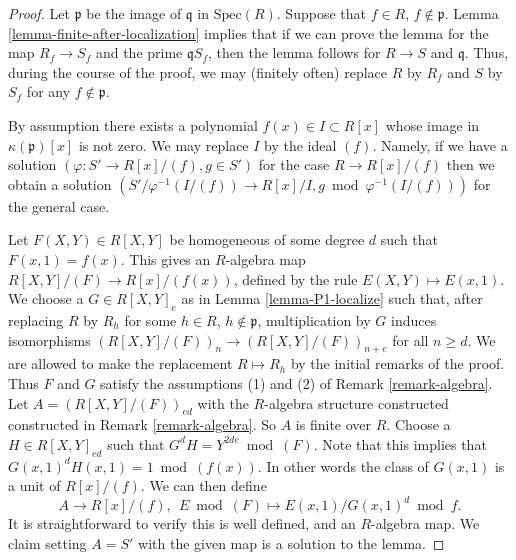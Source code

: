 \begin{proof}
Let $\mathfrak p$ be the image of $\mathfrak q$ in $\text{Spec}(R)$.
Suppose that $f \in R$, $f \not \in \mathfrak p$.
Lemma \ref{lemma-finite-after-localization} implies that if
we can prove the lemma for the map
$R_f \to S_f$ and the prime $\mathfrak qS_f$, then
the lemma follows for $R \to S$ and $\mathfrak q$.
Thus, during the course of the proof, we may (finitely often)
replace $R$ by $R_f$ and $S$ by $S_f$ for any
$f \not \in \mathfrak p$.

\medskip\noindent
By assumption there exists a polynomial $f(x) \in I \subset R[x]$
whose image in $\kappa(\mathfrak p)[x]$ is not zero. We may
replace $I$ by the ideal $(f)$. Namely, if we have a solution
$(\varphi : S' \to R[x]/(f), g \in S')$ for the case $R \to R[x]/(f)$
then we obtain a solution
$(S'/\varphi^{-1}(I/(f)) \to R[x]/I, g \bmod \varphi^{-1}(I/(f)))$
for the general case.

\medskip\noindent
Let $F(X,Y) \in R[X,Y]$ be homogeneous of some degree $d$ such that
$F(x, 1) = f(x)$. This gives an $R$-algebra map $R[X, Y]/(F) \to R[x]/(f(x))$,
defined by the rule $E(X, Y) \mapsto E(x, 1)$.
We choose a $G \in R[X,Y]_e$ as in Lemma \ref{lemma-P1-localize}
such that, after replacing $R$ by $R_h$ for some $h \in R$,
$h \not \in \mathfrak p$, multiplication by $G$ induces isomorphisms
$(R[X, Y]/(F))_n \to (R[X, Y]/(F))_{n + e}$ for
all $n \geq d$. We are allowed to make the replacement
$R \mapsto R_h$ by the initial remarks of the proof.
Thus $F$ and $G$ satisfy the assumptions (1) and (2) of Remark
\ref{remark-algebra}. Let $A = (R[X, Y]/(F))_{ed}$
with the $R$-algebra structure constructed
constructed in Remark \ref{remark-algebra}. So $A$ is finite over $R$.
Choose a $H \in R[X,Y]_{ed}$ such that $G^d H = Y^{2de} \bmod (F)$.
Note that this implies that $G(x,1)^dH(x,1) = 1 \bmod (f(x))$.
In other words the class of $G(x,1)$ is a unit of $R[x]/(f)$.
We can then define
$$
A \longrightarrow R[x]/(f),\ \ 
E \bmod (F) \longmapsto E(x,1)/G(x,1)^d \bmod f.
$$
It is straightforward to verify this is well defined, and an
$R$-algebra map. We claim setting $A = S'$ with the given map 
is a solution to the lemma.


\end{proof}
